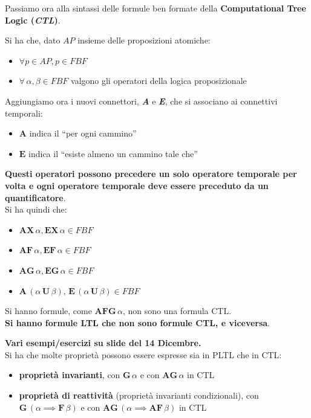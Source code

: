\documentclass[a4paper,12pt, oneside]{book}
\begin{document}
Passiamo ora alla sintassi delle formule ben formate della \textbf{Computational
  Tree Logic (\textit{CTL})}.
\begin{definizione}
  Si ha che, dato $AP$ insieme delle proposizioni atomiche:
  \begin{itemize}
    \item $\forall p\in AP,p\in FBF$
    \item $\forall\,\alpha,\beta\in FBF$ valgono gli operatori della logica
    proposizionale 
  \end{itemize}
  Aggiungiamo ora i nuovi connettori, \textbf{\textit{A}} e \textit{\textbf{E}},
  che si associano ai connettivi temporali:
  \begin{itemize}
    \item $\mathbf{A}$ indica il ``per ogni cammino''
    \item $\mathbf{E}$ indica il ``esiste almeno un cammino tale che''
  \end{itemize}
  \textbf{Questi operatori possono precedere un solo operatore temporale per
    volta e ogni operatore temporale deve essere preceduto da un
    quantificatore}.\\ 
  Si ha quindi che:
  \begin{itemize}
    \item $\mathbf{AX}\,\alpha,\mathbf{EX}\,\alpha\in FBF$
    \item $\mathbf{AF}\,\alpha,\mathbf{EF}\,\alpha\in FBF$
    \item $\mathbf{AG}\,\alpha,\mathbf{EG}\,\alpha\in FBF$
    \item $\mathbf{A}\,(\alpha\,\mathbf{U}\,\beta),\,\mathbf{E}\,
    (\alpha\,\mathbf{U}\,\beta)\in FBF$    
  \end{itemize}
  Si hanno formule, come $\mathbf{AFG}\,\alpha$, non sono una formula CTL. \\
 \textbf{Si hanno formule LTL che non sono formule CTL, e viceversa}.
\end{definizione}
\textbf{Vari esempi/esercizi su slide del 14 Dicembre.}\\
Si ha che molte proprietà possono essere espresse sia in PLTL che in CTL:
\begin{itemize}
  \item \textbf{proprietà invarianti}, con $\mathbf{G}\,\alpha$ e con
  $\mathbf{AG}\,\alpha$ in CTL
  \item \textbf{proprietà di reattività} (proprietà invarianti condizionali),
  con $\mathbf{G}\,(\alpha\implies \mathbf{F}\,\beta)$ e con
  $\mathbf{AG}\,(\alpha\implies \mathbf{AF}\,\beta)$ in CTL
\end{itemize}
\end{document}
